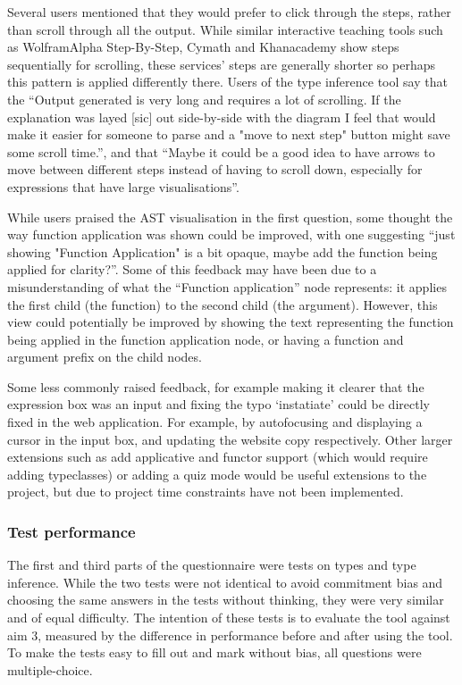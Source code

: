 \documentclass[a4paper,fleqn,12pt]{article}
\begin{document}
Several users mentioned that they would prefer to click through the steps, rather than scroll through all the output. While similar interactive teaching tools such as WolframAlpha Step-By-Step, Cymath and Khanacademy show steps sequentially for scrolling, these services’ steps are generally shorter so perhaps this pattern is applied differently there. Users of the type inference tool say that the “Output generated is very long and requires a lot of scrolling. If the explanation was layed [sic] out side-by-side with the diagram I feel that would make it easier for someone to parse and a "move to next step" button might save some scroll time.”, and that “Maybe it could be a good idea to have arrows to move between different steps instead of having to scroll down, especially for expressions that have large visualisations”.

While users praised the AST visualisation in the first question, some thought the way function application was shown could be improved, with one suggesting “just showing "Function Application" is a bit opaque, maybe add the function being applied for clarity?”. Some of this feedback may have been due to a misunderstanding of what the “Function application” node represents: it applies the first child (the function) to the second child (the argument). However, this view could potentially be improved by showing the text representing the function being applied in the function application node, or having a function and argument prefix on the child nodes.

Some less commonly raised feedback, for example making it clearer that the expression box was an input and fixing the typo ‘instatiate’ could be directly fixed in the web application. For example, by autofocusing and displaying a cursor in the input box, and updating the website copy respectively. Other larger extensions such as add applicative and functor support (which would require adding typeclasses) or adding a quiz mode would be useful extensions to the project, but due to project time constraints have not been implemented.
\subsubsection{Test performance}\label{id:h.cn0p90nrqrmi}
The first and third parts of the questionnaire were tests on types and type inference. While the two tests were not identical to avoid commitment bias and choosing the same answers in the tests without thinking, they were very similar and of equal difficulty. The intention of these tests is to evaluate the tool against aim 3, measured by the difference in performance before and after using the tool. To make the tests easy to fill out and mark without bias, all questions were multiple-choice.
\end{document}
